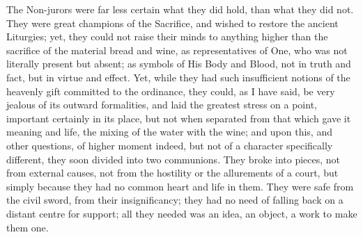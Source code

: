 The Non-jurors were far less certain what they did hold, than what
they did not. They were great champions of the Sacrifice, and wished
to restore the ancient Liturgies; yet, they could not raise their
minds to anything higher than the sacrifice of the material bread and
wine, as representatives of One, who was not literally present but
absent; as symbols of His Body and Blood, not in truth and fact, but
in virtue and effect. Yet, while they had such insufficient notions of
the heavenly gift committed to the ordinance, they could, as I have
said, be very jealous of its outward formalities, and laid the
greatest stress on a point, important certainly in its place, but not
when separated from that which gave it meaning and life, the mixing of
the water with the wine; and upon this, and other questions, of higher
moment indeed, but not of a character specifically different, they
soon divided into two communions. They broke into pieces, not from
external causes, not from the hostility or the allurements of a court,
but simply because they had no common heart and life in them. They
were safe from the civil sword, from their insignificancy; they had no
need of falling back on a distant centre for support; all they needed
was an idea, an object, a work to make them one.

